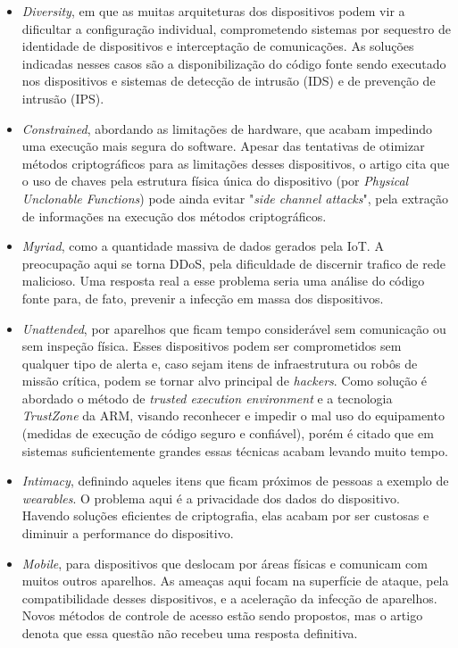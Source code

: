 \documentclass[letterpaper,11pt]{texMemo} %
\begin{document}
\begin{itemize}
\begin{itemize}
		\item \textit{Diversity}, em que as muitas arquiteturas dos dispositivos podem vir a dificultar a configuração individual, comprometendo sistemas por sequestro de identidade de dispositivos e interceptação de comunicações. As soluções indicadas nesses casos são a disponibilização do código fonte sendo executado nos dispositivos e sistemas de detecção de intrusão (IDS) e de prevenção de intrusão (IPS).
		\item \textit{Constrained}, abordando as limitações de hardware, que acabam impedindo uma execução mais segura do software. Apesar das tentativas de otimizar métodos criptográficos para as limitações desses dispositivos, o artigo cita que o uso de chaves pela estrutura física única do dispositivo (por \textit{Physical Unclonable Functions}) pode ainda evitar "\textit{side channel attacks}", pela extração de informações na execução dos métodos criptográficos.
		\item \textit{Myriad}, como a quantidade massiva de dados gerados pela IoT. A preocupação aqui se torna DDoS, pela dificuldade de discernir trafico de rede malicioso. Uma resposta real a esse problema seria uma análise do código fonte para, de fato, prevenir a infecção em massa dos dispositivos.
		\item \textit{Unattended}, por aparelhos que ficam tempo considerável sem comunicação ou sem inspeção física. Esses dispositivos podem ser comprometidos sem qualquer tipo de alerta e, caso sejam itens de infraestrutura ou robôs de missão crítica, podem se tornar alvo principal de \textit{hackers}. Como solução é abordado o método de \textit{trusted execution environment} e a tecnologia \textit{TrustZone} da ARM, visando reconhecer e impedir o mal uso do equipamento (medidas de execução de código seguro e confiável), porém é citado que em sistemas suficientemente grandes essas técnicas acabam levando muito tempo.
		\item \textit{Intimacy}, definindo aqueles itens que ficam próximos de pessoas a exemplo de \textit{wearables}. O problema aqui é a privacidade dos dados do dispositivo. Havendo soluções eficientes de criptografia, elas acabam por ser custosas e diminuir a performance do dispositivo.
		\item \textit{Mobile}, para dispositivos que deslocam por áreas físicas e comunicam com muitos outros aparelhos. As ameaças aqui focam na superfície de ataque, pela compatibilidade desses dispositivos, e a aceleração da infecção de aparelhos. Novos métodos de controle de acesso estão sendo propostos, mas o artigo denota que essa questão não recebeu uma resposta definitiva.

\end{itemize}
\end{itemize}
\end{document}
